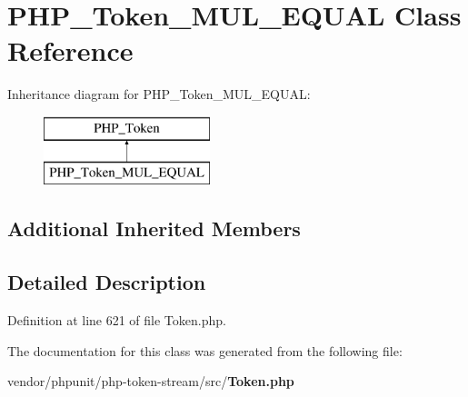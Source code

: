 \section{P\+H\+P\+\_\+\+Token\+\_\+\+M\+U\+L\+\_\+\+E\+Q\+U\+A\+L Class Reference}
\label{class_p_h_p___token___m_u_l___e_q_u_a_l}
Inheritance diagram for P\+H\+P\+\_\+\+Token\+\_\+\+M\+U\+L\+\_\+\+E\+Q\+U\+A\+L\+:\begin{figure}[H]
\begin{center}
\leavevmode
\includegraphics[height=2.000000cm]{class_p_h_p___token___m_u_l___e_q_u_a_l}
\end{center}
\end{figure}
\subsection*{Additional Inherited Members}


\subsection{Detailed Description}


Definition at line 621 of file Token.\+php.



The documentation for this class was generated from the following file\+:\begin{DoxyCompactItemize}
\item 
vendor/phpunit/php-\/token-\/stream/src/{\bf Token.\+php}\end{DoxyCompactItemize}
